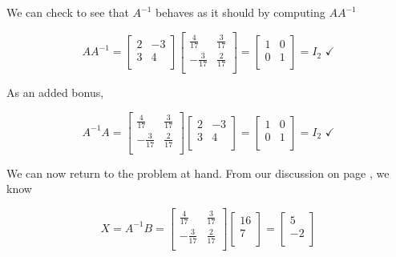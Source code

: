 \documentclass{ximera}
\begin{document}
We can check to see that $A^{-1}$ behaves as it should by computing $AA^{-1}$

\[ AA^{-1} = \left[ \begin{array}{rr} 2 & -3 \\ 3 & 4 \\ \end{array} \right] \left[ \begin{array}{rr} \frac{4}{17} & \frac{3}{17} \\   -\frac{3}{17} & \frac{2}{17} \\ \end{array} \right] = \left[ \begin{array}{rr} 1 & 0 \\ 0 & 1 \\ \end{array} \right] = I_2 \, \, \checkmark\]

As an added bonus, 

\[ A^{-1}A = \left[ \begin{array}{rr} \frac{4}{17} & \frac{3}{17} \\   -\frac{3}{17} & \frac{2}{17} \\ \end{array} \right]\left[ \begin{array}{rr} 2 & -3 \\ 3 & 4 \\ \end{array} \right]  = \left[ \begin{array}{rr} 1 & 0 \\ 0 & 1 \\ \end{array} \right] = I_2 \, \, \checkmark\]

We can now return to the problem at hand.  From our discussion  on page \pageref{solvingmatrixeqn}, we know

\[ X = A^{-1}B = \left[ \begin{array}{rr} \frac{4}{17} & \frac{3}{17} \\   -\frac{3}{17} & \frac{2}{17} \\ \end{array} \right]\left[ \begin{array}{r} 16 \\ 7 \\ \end{array} \right] = \left[ \begin{array}{r} 5 \\ -2 \\ \end{array} \right] \]
\end{document}
